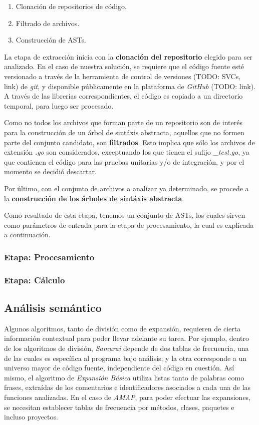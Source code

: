 \begin{enumerate}
  \item Clonación de repositorios de código.
  \item Filtrado de archivos.
  \item Construcción de ASTs.
\end{enumerate}

La etapa de extracción inicia con la \textbf{clonación del repositorio} elegido para ser
analizado. En el caso de nuestra solución, se requiere que el código fuente esté
versionado a través de la herramienta de control de versiones (TODO: SVCs, link) de \textit{git},
y disponible públicamente en la plataforma de \textit{GitHub} (TODO: link).
A través de las librerías correspondientes, el código es copiado a un directorio temporal,
para luego ser procesado.

Como no todos los archivos que forman parte de un repositorio son de interés para la construcción
de un árbol de sintáxis abstracta, aquellos que no formen parte del conjunto candidato, son
\textbf{filtrados}.
Esto implica que sólo los archivos de extensión \textit{.go} son considerados, exceptuando
los que tienen el sufijo \textit{\_test.go}, ya que contienen el código para las pruebas
unitarias y/o de integración, y por el momento se decidió descartar.

Por último, con el conjunto de archivos a analizar ya determinado, se procede a la
\textbf{construcción de los árboles de sintáxis abstracta}.



Como resultado de esta etapa, tenemos un conjunto de ASTs, los cuales sirven como parámetros
de entrada para la etapa de procesamiento, la cual es explicada a continuación.

\subsubsection{Etapa: Procesamiento}

\subsubsection{Etapa: Cálculo}

\subsection{Análisis semántico}
Algunos algoritmos, tanto de división como de expansión, requieren de cierta información contextual para poder llevar adelante su tarea.
Por ejemplo, dentro de los algoritmos de división, \textit{Samurai} depende de dos tablas de frecuencia, una de las cuales es específica al programa bajo análisis; y la otra corresponde a un universo mayor de código fuente, independiente del código en cuestión.
Así mismo, el algoritmo de \textit{Expansión Básica} utiliza listas tanto de palabras como frases, extraídas de los comentarios e identificadores asociados a cada una de las funciones analizadas.
En el caso de \textit{AMAP}, para poder efectuar las expansiones, se necesitan establecer tablas de frecuencia por métodos, clases, paquetes e incluso proyectos.

